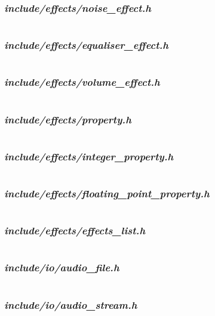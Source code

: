 \subsubsection {\textit{include/effects/noise\_effect.h}}
\inputminted[linenos]{c++}{../include/effects/noise_effect.h}
\pagebreak
\subsubsection {\textit{include/effects/equaliser\_effect.h}}
\inputminted[linenos]{c++}{../include/effects/equaliser_effect.h}
\pagebreak
\subsubsection {\textit{include/effects/volume\_effect.h}}
\inputminted[linenos]{c++}{../include/effects/volume_effect.h}
\pagebreak
\subsubsection {\textit{include/effects/property.h}}
\inputminted[linenos]{c++}{../include/effects/property.h}
\pagebreak
\subsubsection {\textit{include/effects/integer\_property.h}}
\inputminted[linenos]{c++}{../include/effects/integer_property.h}
\pagebreak
\subsubsection {\textit{include/effects/floating\_point\_property.h}}
\inputminted[linenos]{c++}{../include/effects/floating_point_property.h}
\pagebreak
\subsubsection {\textit{include/effects/effects\_list.h}}
\inputminted[linenos]{c++}{../include/effects/effects_list.h}
\pagebreak
\subsubsection {\textit{include/io/audio\_file.h}}
\inputminted[linenos]{c++}{../include/io/audio_file.h}
\pagebreak
\subsubsection {\textit{include/io/audio\_stream.h}}
\inputminted[linenos]{c++}{../include/io/audio_stream.h}
\pagebreak
